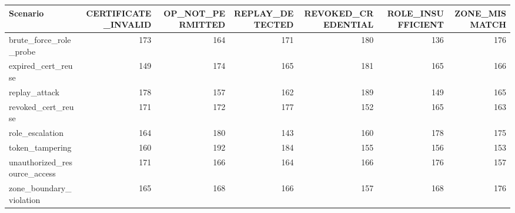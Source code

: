 \begin{tabular}{lrrrrrr}
\toprule
Scenario & CERTIFICATE\_INVALID & OP\_NOT\_PERMITTED & REPLAY\_DETECTED & REVOKED\_CREDENTIAL & ROLE\_INSUFFICIENT & ZONE\_MISMATCH \\
\midrule
brute\_force\_role\_probe & 173 & 164 & 171 & 180 & 136 & 176 \\
expired\_cert\_reuse & 149 & 174 & 165 & 181 & 165 & 166 \\
replay\_attack & 178 & 157 & 162 & 189 & 149 & 165 \\
revoked\_cert\_reuse & 171 & 172 & 177 & 152 & 165 & 163 \\
role\_escalation & 164 & 180 & 143 & 160 & 178 & 175 \\
token\_tampering & 160 & 192 & 184 & 155 & 156 & 153 \\
unauthorized\_resource\_access & 171 & 166 & 164 & 166 & 176 & 157 \\
zone\_boundary\_violation & 165 & 168 & 166 & 157 & 168 & 176 \\
\bottomrule
\end{tabular}
